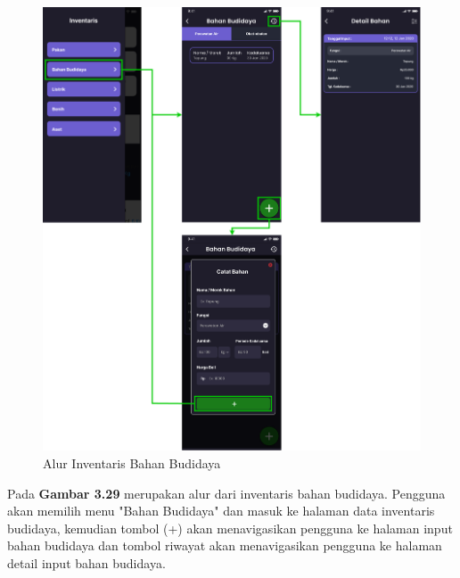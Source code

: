 \begin{enumerate}
\begin{enumerate}
		\begin{figure}[H]
			\centering
			\includegraphics[width=1\textwidth]{gambar/sprint2/flow_materials.png}
			\caption{Alur Inventaris Bahan Budidaya}
		\end{figure}

		Pada \textbf{Gambar 3.29} merupakan alur dari inventaris bahan budidaya. Pengguna akan memilih menu "Bahan Budidaya" dan masuk ke halaman data inventaris budidaya, kemudian tombol (+) akan menavigasikan pengguna ke halaman input bahan budidaya dan tombol riwayat akan menavigasikan pengguna ke halaman detail input bahan budidaya.


\end{enumerate}
\end{enumerate}
